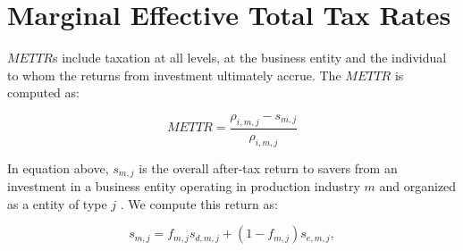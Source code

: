 \documentclass[article,11pt,letterpaper,fleqn]{article}
\theoremstyle{definition}
\numberwithin{equation}{section}
\begin{document}
%
%
%
%
%
%
%
%
%


\section{Marginal Effective Total Tax Rates}
\label{sec:METTR}

$METTR$s include taxation at all levels, at the business entity and the individual to whom the returns from investment ultimately accrue.  The $METTR$ is computed as:


\begin{equation}
METTR = \frac{\rho_{i,m,j}-s_{m,j}}{\rho_{i,m,j}}
\end{equation}

\noindent\noindent In equation above, $s_{m,j}$ is the overall after-tax return to savers from an investment in a business entity operating in production industry $m$ and organized as a entity of type $j$ .  We compute this return as:

\begin{equation}
s_{m,j} = f_{m,j}s_{d,m,j} + (1-f_{m,j})s_{e,m,j},
\end{equation}
\end{document}
